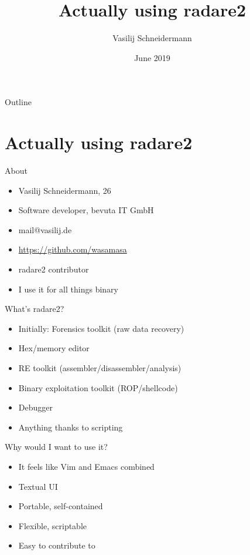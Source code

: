 \documentclass[presentation]{beamer}
\author{Vasilij Schneidermann}
\date{June 2019}
\title{Actually using radare2}
\begin{document}
\maketitle
\begin{frame}{Outline}
\tableofcontents
\end{frame}

\AtBeginSection{\frame{\sectionpage}}

\section{Actually using radare2}
\label{sec:orgf407704}

\begin{frame}[label={sec:orgfa62179}]{About}
\begin{itemize}
\item Vasilij Schneidermann, 26
\item Software developer, bevuta IT GmbH
\item mail@vasilij.de
\item \url{https://github.com/wasamasa}
\item radare2 contributor
\item I use it for all things binary
\end{itemize}
\end{frame}

\begin{frame}[label={sec:orge9ad4d7}]{What's radare2?}
\begin{itemize}
\item Initially: Forensics toolkit (raw data recovery)
\item Hex/memory editor
\item RE toolkit (assembler/disassembler/analysis)
\item Binary exploitation toolkit (ROP/shellcode)
\item Debugger
\item Anything thanks to scripting
\end{itemize}
\end{frame}

\begin{frame}[label={sec:org7cfbff0}]{Why would I want to use it?}
\begin{itemize}
\item It feels like Vim and Emacs combined
\item Textual UI
\item Portable, self-contained
\item Flexible, scriptable
\item Easy to contribute to
\end{itemize}
\end{frame}
\end{document}
